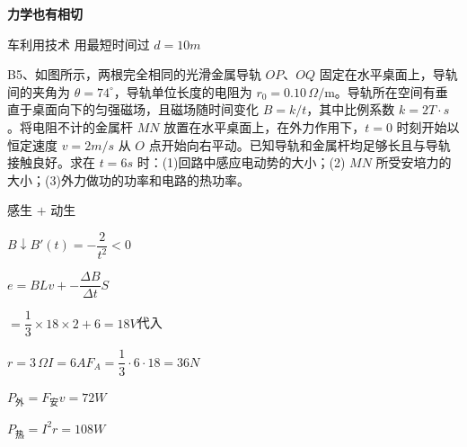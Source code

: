 \begin{problem}
\textbf{力学也有相切}

车利用技术 用最短时间过  $d=10\unit{m}$ %
\begin{solution}





\end{solution}
\end{problem}
\begin{problem}
B5、如图所示，两根完全相同的光滑金属导轨 $OP$、$OQ$ 固定在水平桌面上，导轨间的夹角为 $\theta=74^\circ$，导轨单位长度的电阻为 $r_0=0.10\,\Omega/\mathrm{m}$。导轨所在空间有垂直于桌面向下的匀强磁场，且磁场随时间变化 $B=k/t$，其中比例系数 $k=2\unit{T\cdot s}$。将电阻不计的金属杆 $MN$ 放置在水平桌面上，在外力作用下，$t=0$ 时刻开始以恒定速度 $v=2\unit{m/s}$ 从 $O$ 点开始向右平动。已知导轨和金属杆均足够长且与导轨接触良好。求在 $t=6\unit{s}$ 时：(1)回路中感应电动势的大小；(2) $MN$ 所受安培力的大小；(3)外力做功的功率和电路的热功率。
\begin{solution}
感生 $+$ 动生

$B\downarrow$\qquad $B'(t)=-\dfrac{2}{t^2}<0$

$e=BLv+{-}\dfrac{\Delta B}{\Delta t}S$

$=\dfrac{1}{3}\times18\times2+6=18\unit{V}$\qquad 代入

$r=3\,\Omega$\quad $I=6\unit{A}$\quad $F_A=\dfrac{1}{3}\cdot6\cdot18=36\unit{N}$

$P_{\text{外}}=F_{\text{安}}v=72\unit{W}$

$P_{\text{热}}=I^2r=108\unit{W}$
\end{solution}
\end{problem}
